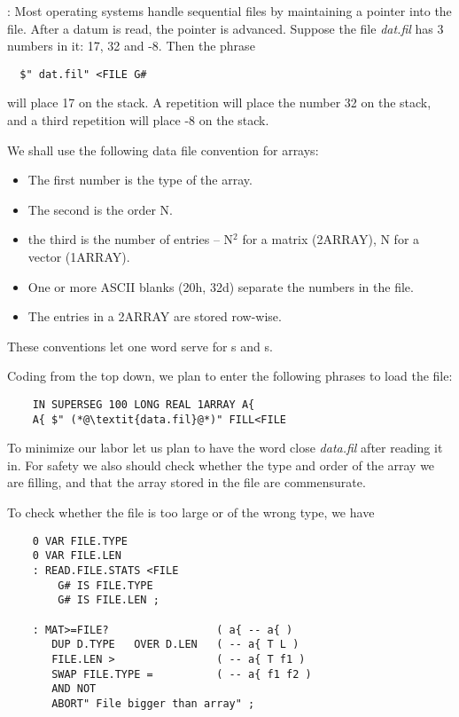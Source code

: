 \leftbar[1\linewidth]
\Note: Most operating systems handle sequential files by maintaining a pointer into the file.
After a datum is read, the pointer is advanced.
Suppose the file \textit{dat.fil} has 3 numbers in it: 17, 32 and -8.
Then the phrase
\endleftbar

\begin{lstlisting}
  $" dat.fil" <FILE G#
\end{lstlisting}

will place 17 on the stack. A repetition will place the number 32 on the stack, and a third repetition will place -8 on the stack.

We shall use the following data file convention for arrays:
\begin{itemize}
    \item The first number is the type of the array.
    \item The second is the order N.
    \item the third is the number of entries -- N$^2$ for a matrix (2ARRAY), N for a vector (1ARRAY).
    \item One or more ASCII blanks (20h, 32d) separate the numbers in the file.
    \item The entries in a 2ARRAY are stored row-wise.
\end{itemize}

These conventions let one word serve for s and s.

Coding from the top down, we plan to enter the following phrases to load the file:

\begin{lstlisting}
    IN SUPERSEG 100 LONG REAL 1ARRAY A{
    A{ $" (*@\textit{data.fil}@*)" FILL<FILE
\end{lstlisting}

To minimize our labor let us plan to have the word  close \textit{data.fil} after reading it in. For safety we also should check whether the type and order of the array we are filling, and that the array stored in the file are commensurate.

To check whether the file is too large or of the wrong type, we have

\begin{lstlisting}
    0 VAR FILE.TYPE
    0 VAR FILE.LEN
    : READ.FILE.STATS <FILE
        G# IS FILE.TYPE
        G# IS FILE.LEN ;

    : MAT>=FILE?                 ( a{ -- a{ )
       DUP D.TYPE   OVER D.LEN   ( -- a{ T L )
       FILE.LEN >                ( -- a{ T f1 )
       SWAP FILE.TYPE =          ( -- a{ f1 f2 )
       AND NOT
       ABORT" File bigger than array" ;
\end{lstlisting}

